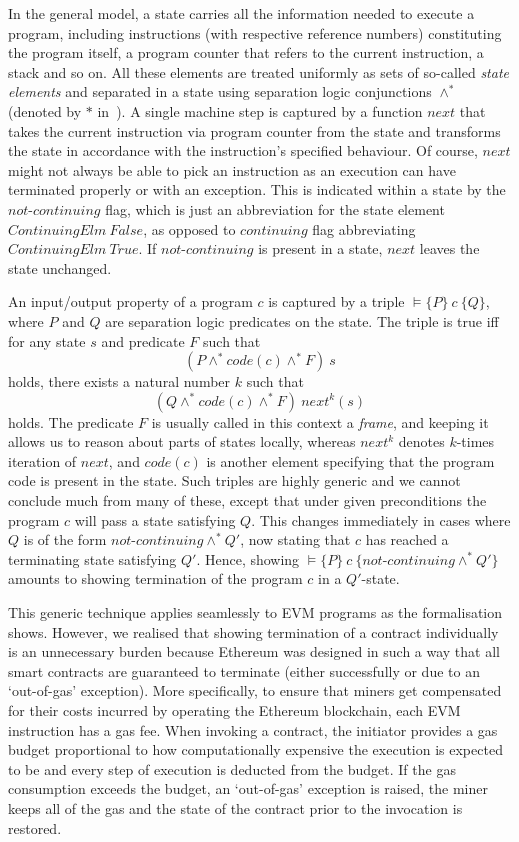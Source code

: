 \documentclass[sigplan,10pt,review]{acmart}\settopmatter{printfolios=true,printccs=false,printacmref=false}
\newcommand{\sconj}{\wedge^*}
\newcommand{\pvalid}[3]{\models\{#1\}\:#2\:\{#3\}}
\newcommand{\xnext}{\mathit{next}}
\newcommand{\code}[1]{\mathit{code}(#1)}
\newcommand{\cont}{\mathit{continuing}}
\newcommand{\ncont}{\mathit{not\mbox{-}continuing}}
\begin{document}
In the general model, a state carries all the information needed to execute a program, including
instructions (with respective reference numbers) constituting the program itself, a program counter that
refers to the current instruction, a stack and so on. All these elements are treated uniformly 
as sets of so-called \emph{state elements}
and separated in a state using separation logic conjunctions $\sconj$ (denoted by $*$ in~\cite{Reynolds_02}).  
A single machine step is captured by a function $\xnext$ that 
takes the current instruction via program counter from the state and transforms the state in accordance with the instruction's
specified behaviour. Of course, $\xnext$ might not always be able to pick an instruction
as an execution can have terminated properly or with an exception. This is indicated within a state
by the $\ncont$ flag, which is just an abbreviation for the state element 
$\mathit{ContinuingElm}\:\mathit{False}$, 
as opposed to $\cont$ flag abbreviating $\mathit{ContinuingElm}\:\mathit{True}$. 
If $\ncont$ is present in a state, $\xnext$ leaves the state unchanged.   
   
An input/output property of a program $c$ is captured by a triple
$\pvalid{P}{c}{Q}$, where $P$ and $Q$ are separation logic predicates on the state.
The triple is true iff for any state $s$ and predicate $F$ such that
\[
(P \sconj \code{c} \sconj F)\:s
\] 
holds, there exists a natural number $k$ such that 
\[
(Q \sconj \code{c} \sconj F)\:\xnext^k(s)
\] 
holds. The predicate $F$ is usually called in this context a \emph{frame}, 
and keeping it allows us to reason about parts of states locally, %
whereas $\xnext^k$ denotes $k$-times iteration of $\xnext$, and $\code{c}$ is another element
specifying that the program code is present in the state.
Such triples %
are highly generic and we cannot conclude much from many of these, except that
under given preconditions the program $c$ will pass a state satisfying $Q$. This changes immediately in cases where $Q$ is of
the form $\ncont \sconj Q'$, now stating that $c$ has reached a terminating state satisfying $Q'$.
Hence, showing $\pvalid{P}{c}{\ncont \sconj Q'}$ amounts to showing termination of the program $c$ in
a $Q'$-state.

This generic technique applies seamlessly to EVM programs as
the formalisation~\cite{Yoichi} shows.
However, we realised that showing termination of a contract individually is an unnecessary burden because
Ethereum was designed in such a way that all smart contracts
are guaranteed to terminate (either successfully or due to an `out-of-gas' exception).
More specifically, to ensure that miners get compensated for their costs
incurred by operating the Ethereum blockchain, each EVM instruction
has a gas fee.
When invoking a contract, the initiator provides a gas budget
proportional to how computationally expensive the execution is expected
to be and every step of execution is deducted from the budget.
If the gas consumption exceeds the budget, an `out-of-gas' exception is
raised,
the miner keeps all of the gas and
the state of the contract prior to the
invocation is restored.
\end{document}
